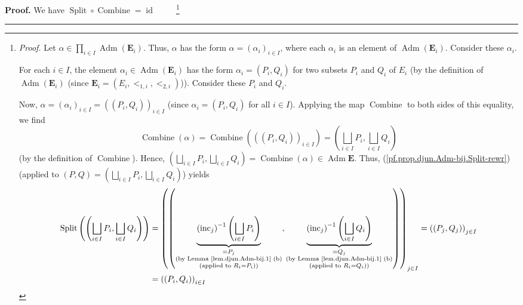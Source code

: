 \documentclass[numbers=enddot,12pt,final,onecolumn,notitlepage,abstracton]{scrartcl}
\theoremstyle{definition}
\newenvironment{proof}[1][Proof]{\noindent\textbf{#1.} }{\ \rule{0.5em}{0.5em}}
\let\prodnonlimits\prod
\renewcommand{\prod}{\prodnonlimits\limits}
\newenvironment{verlong}{}{}
\begin{document}
\begin{verlong}
\begin{footnotesize}
\begin{proof}
We have $\operatorname*{Split}\circ\operatorname*{Combine}=\operatorname*{id}%
$\ \ \ \ \ \footnote{\textit{Proof.} Let $\alpha\in\prod_{i\in I}%
\operatorname*{Adm}\left(  \mathbf{E}_{i}\right)  $. Thus, $\alpha$ has the
form $\alpha=\left(  \alpha_{i}\right)  _{i\in I}$, where each $\alpha_{i}$ is
an element of $\operatorname*{Adm}\left(  \mathbf{E}_{i}\right)  $. Consider
these $\alpha_{i}$.
\par
For each $i\in I$, the element $\alpha_{i}\in\operatorname*{Adm}\left(
\mathbf{E}_{i}\right)  $ has the form $\alpha_{i}=\left(  P_{i},Q_{i}\right)
$ for two subsets $P_{i}$ and $Q_{i}$ of $E_{i}$ (by the definition of
$\operatorname*{Adm}\left(  \mathbf{E}_{i}\right)  $ (since $\mathbf{E}%
_{i}=\left(  E_{i},<_{1,i},<_{2,i}\right)  $)). Consider these $P_{i}$ and
$Q_{i}$.
\par
Now, $\alpha=\left(  \alpha_{i} \right)  _{i\in I} =\left(  \left(
P_{i},Q_{i}\right)  \right)  _{i\in I} $ (since $\alpha_{i}=\left(
P_{i},Q_{i}\right)  $ for all $i \in I$). Applying the map
$\operatorname*{Combine}$ to both sides of this equality, we find%
\[
\operatorname*{Combine}\left(  \alpha\right)  =\operatorname*{Combine}\left(
\left(  \left(  P_{i},Q_{i}\right)  \right)  _{i\in I}\right)  =\left(
\bigsqcup_{i\in I}P_{i},\bigsqcup_{i\in I}Q_{i}\right)
\]
(by the definition of $\operatorname*{Combine}$). Hence, $\left(
\bigsqcup_{i\in I}P_{i},\bigsqcup_{i\in I}Q_{i}\right)
=\operatorname*{Combine}\left(  \alpha\right)  \in\operatorname*{Adm}%
\mathbf{E}$. Thus, (\ref{pf.prop.djun.Adm-bij.Split-rewr}) (applied to
$\left(  P,Q\right)  =\left(  \bigsqcup_{i\in I}P_{i},\bigsqcup_{i\in I}%
Q_{i}\right)  $) yields%
\begin{align*}
\operatorname*{Split}\left(  \left(  \bigsqcup_{i\in I}P_{i},\bigsqcup_{i\in
I}Q_{i}\right)  \right)   &  =\left(  \left(  \underbrace{\left(
\operatorname*{inc}\nolimits_{j}\right)  ^{-1}\left(  \bigsqcup_{i\in I}%
P_{i}\right)  }_{\substack{=P_{j}\\\text{(by Lemma \ref{lem.djun.Adm-bij.1}
(b)}\\\text{(applied to }R_{i}=P_{i}\text{))}}},\underbrace{\left(
\operatorname*{inc}\nolimits_{j}\right)  ^{-1}\left(  \bigsqcup_{i\in I}%
Q_{i}\right)  }_{\substack{=Q_{j}\\\text{(by Lemma \ref{lem.djun.Adm-bij.1}
(b)}\\\text{(applied to }R_{i}=Q_{i}\text{))}}}\right)  \right)  _{j\in I}
=\left(  \left(  P_{j},Q_{j}\right)  \right)  _{j\in I}\\
&  =\left(  \left(  P_{i},Q_{i}\right)  \right)  _{i\in I}

\end{align*}}
\end{proof}
\end{footnotesize}
\end{verlong}
\end{document}
